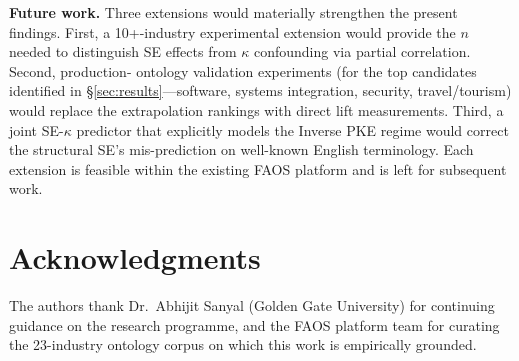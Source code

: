 \documentclass[11pt,a4paper]{article}
\newcommand{\faos}{\textsc{FAOS}}
\newcommand{\kapp}{\kappa}
\begin{document}
\textbf{Future work.} Three extensions would materially strengthen
the present findings. First, a 10+-industry experimental extension
would provide the $n$ needed to distinguish SE effects from
$\kapp$ confounding via partial correlation. Second, production-%
ontology validation experiments (for the top candidates identified in
\S\ref{sec:results}---software, systems integration, security,
travel/tourism) would replace the extrapolation rankings with direct
lift measurements. Third, a joint SE-$\kapp$ predictor that
explicitly models the Inverse PKE regime would correct the structural
SE's mis-prediction on well-known English terminology. Each extension
is feasible within the existing \faos{} platform and is left for
subsequent work.

\section*{Acknowledgments}

The authors thank Dr.\ Abhijit Sanyal (Golden Gate University) for
continuing guidance on the research programme, and the \faos{} platform
team for curating the 23-industry ontology corpus on which this work is
empirically grounded.


\end{document}

